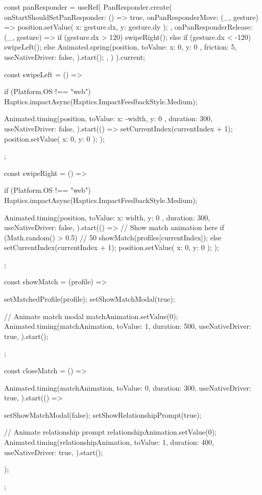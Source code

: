 {  const panResponder = useRef(
    PanResponder.create({
      onStartShouldSetPanResponder: () => true,
      onPanResponderMove: (_, gesture) => {
        position.setValue({ x: gesture.dx, y: gesture.dy });
      },
      onPanResponderRelease: (_, gesture) => {
        if (gesture.dx > 120) {
          swipeRight();
        } else if (gesture.dx < -120) {
          swipeLeft();
        } else {
          Animated.spring(position, {
            toValue: { x: 0, y: 0 },
            friction: 5,
            useNativeDriver: false,
          }).start();
        }
      },
    })
  ).current;
  
  const swipeLeft = () => {
    if (Platform.OS !== "web") {
      Haptics.impactAsync(Haptics.ImpactFeedbackStyle.Medium);
    }
    
    Animated.timing(position, {
      toValue: { x: -width, y: 0 },
      duration: 300,
      useNativeDriver: false,
    }).start(() => {
      setCurrentIndex(currentIndex + 1);
      position.setValue({ x: 0, y: 0 });
    });
  };
  
  const swipeRight = () => {
    if (Platform.OS !== "web") {
      Haptics.impactAsync(Haptics.ImpactFeedbackStyle.Medium);
    }
    
    Animated.timing(position, {
      toValue: { x: width, y: 0 },
      duration: 300,
      useNativeDriver: false,
    }).start(() => {
      // Show match animation here
      if (Math.random() > 0.5) { // 50%
        showMatch(profiles[currentIndex]);
      } else {
        setCurrentIndex(currentIndex + 1);
        position.setValue({ x: 0, y: 0 });
      }
    });
  };

  const showMatch = (profile) => {
    setMatchedProfile(profile);
    setShowMatchModal(true);
    
    // Animate match modal
    matchAnimation.setValue(0);
    Animated.timing(matchAnimation, {
      toValue: 1,
      duration: 500,
      useNativeDriver: true,
    }).start();
  };

  const closeMatch = () => {
    Animated.timing(matchAnimation, {
      toValue: 0,
      duration: 300,
      useNativeDriver: true,
    }).start(() => {
      setShowMatchModal(false);
      setShowRelationshipPrompt(true);
      
      // Animate relationship prompt
      relationshipAnimation.setValue(0);
      Animated.timing(relationshipAnimation, {
        toValue: 1,
        duration: 400,
        useNativeDriver: true,
      }).start();
    });
  };

}
